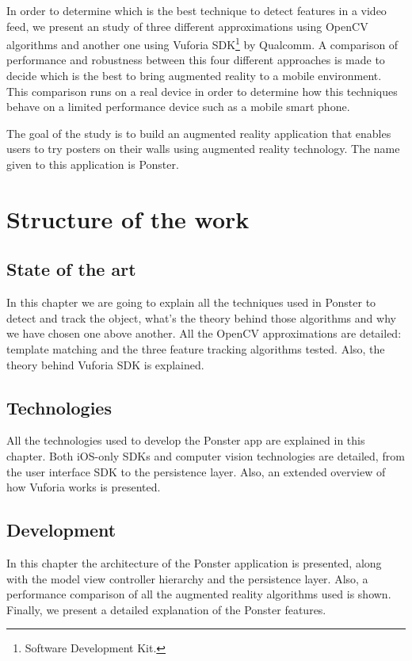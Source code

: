 In order to determine which is the best technique to detect features in a
video feed, we present
an study of three different approximations using OpenCV algorithms and another one
using Vuforia SDK\footnote{Software Development Kit.} by Qualcomm\textregistered. A
comparison of performance and 
robustness between this four different approaches is made to decide which is the
best to bring augmented reality to a mobile environment. This comparison runs
on a real device in order to determine how this techniques behave on a limited
performance device such as a mobile smart phone.

The goal of the study is to build an augmented reality application that enables 
users to try posters on their walls using augmented reality technology. The
name given to this application is Ponster.

\section*{Structure of the work}
\subsection*{State of the art}
In this chapter we are going to explain all the techniques used in Ponster to
detect and track the object, what's the theory behind those algorithms and why
we have chosen one above another. All the OpenCV approximations are detailed:
template matching and the three feature tracking algorithms tested. Also, the
theory behind Vuforia SDK is explained.

\subsection*{Technologies}
All the technologies used to develop the Ponster app are explained in this
chapter. Both iOS-only SDKs and computer vision technologies are detailed,
from the user interface SDK to the persistence layer. Also, an extended
overview of how Vuforia works is presented.

\subsection*{Development}
In this chapter the architecture of the Ponster application is presented, along
with the model view controller hierarchy and the persistence layer. Also, a
performance comparison of all the augmented reality algorithms used is
shown. Finally, we present a detailed explanation of the Ponster features.

